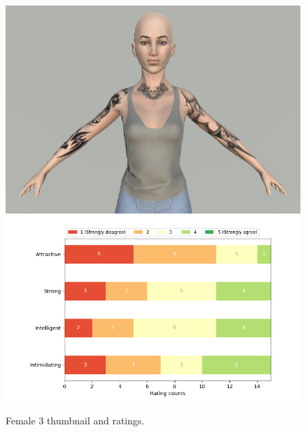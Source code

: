 \begin{figure}[H]
  \includegraphics[width=\linewidth]{Images/Females/3.JPG}
\endminipage\hfill
{}
  \includegraphics[width=\linewidth]{Survey/FRatings/avatar_f3.png}
\endminipage\hfill
\caption{Female 3 thumbnail and ratings.}
\end{figure}

